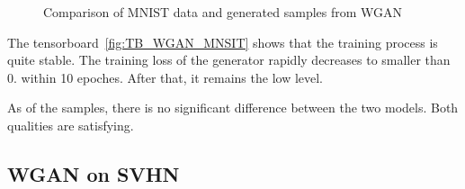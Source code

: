 \documentclass{article}
\begin{document}
\begin{figure}[!htb]
  \centering
  \caption{Comparison of MNIST data and generated samples from WGAN}
\end{figure}

The tensorboard~\ref{fig:TB_WGAN_MNSIT} shows that the training process is quite stable. The training loss of the generator rapidly decreases to smaller than $0.$ within 10 epoches. After that, it remains the low level.

As of the samples, there is no significant difference between the two models. Both qualities are satisfying.

\subsection{WGAN on SVHN}
\end{document}
